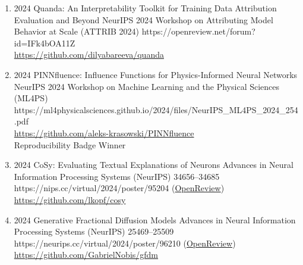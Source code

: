 {\begin{enumerate}
        
        
        \item {}
                        {2024}
                        {Quanda: An Interpretability Toolkit for Training Data Attribution Evaluation and Beyond}
                        {NeurIPS 2024 Workshop on Attributing Model Behavior at Scale (ATTRIB 2024)}
                        {}
                        {https://openreview.net/forum?id=IFk4bOA11Z}
                        {
                        \\
                        \href{https://github.com/dilyabareeva/quanda}{https://github.com/dilyabareeva/quanda}
                        }


        \item {}
                        {2024}
                        {PINNfluence: Influence Functions for Physics-Informed Neural Networks}
                        {NeurIPS 2024 Workshop on Machine Learning and the Physical Sciences (ML4PS)}
                        {}
                        {https://ml4physicalsciences.github.io/2024/files/NeurIPS_ML4PS_2024_254.pdf}
                        {\\\href{https://github.com/aleks-krasowski/PINNfluence}{https://github.com/aleks-krasowski/PINNfluence}\\
                        Reproducibility Badge Winner}


        \item {}
                        {2024}
                        {CoSy: Evaluating Textual Explanations of Neurons}
                        {Advances in Neural Information Processing Systems (NeurIPS)}
                        {34656--34685}
                        {https://nips.cc/virtual/2024/poster/95204}
                        {(\href{https://openreview.net/forum?id=2g84EvFlRt}{OpenReview})\\
                        \href{https://github.com/lkopf/cosy}{https://github.com/lkopf/cosy}
                        }


        \item {}
                        {2024}
                        {Generative Fractional Diffusion Models}
                        {Advances in Neural Information Processing Systems (NeurIPS)}
                        {25469--25509}
                        {https://neurips.cc/virtual/2024/poster/96210}
                        {(\href{https://openreview.net/forum?id=B9qg3wo75g}{OpenReview})\\
                        \href{https://github.com/GabrielNobis/gfdm}{https://github.com/GabrielNobis/gfdm}
                        }


\end{enumerate}}
